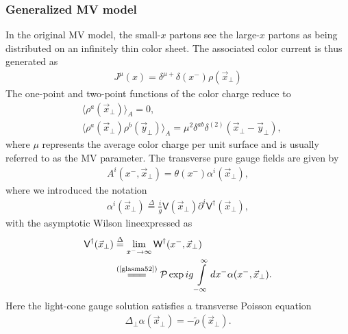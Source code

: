 \subsubsection*{Generalized MV model}
In the original {\sffamily MV} model, the small-$x$ partons see the large-$x$ partons as being distributed on an infinitely thin color sheet. The associated color current is thus generated as 
\begin{align}\label{sglasma8}
    J^\mu(x)=\delta^{\mu+}\delta(x^-)\rho(\vec{x}_\perp)
\end{align}
The one-point and two-point functions of the color charge reduce to
\begin{align*}
&\langle \rho^a\left(\vec{x}_\perp\right)\rangle_A=0,\\
&\langle \rho^a\left(\vec{x}_\perp\right)\rho^b\left(\vec{y}_\perp\right)\rangle_A=\mu^2\delta^{ab}\delta^{(2)}\left(\vec{x}_\perp-\vec{y}_\perp\right),
\end{align*}
where $\mu$ represents the average color charge per unit surface and is usually referred to as the {\sffamily MV} parameter. The transverse pure gauge fields are given by 
\begin{align}\label{sglasma4}
    A^i(x^-,\vec{x}_\perp)=\theta(x^-)\alpha^i(\vec{x}_\perp),
\end{align}
where we introduced the notation
\begin{align}\label{sglasma5}
    \alpha^i(\vec{x}_\perp)\overset{\Delta}{=}\frac{i}{g}\textsf{V}(\vec{x}_\perp)\partial^i\textsf{V}^\dagger(\vec{x}_\perp),
\end{align}
with the asymptotic Wilson lineexpressed as
\begin{align*}
    \textsf{V}^\dagger(\vec{x}_\perp)&\overset{\Delta}{=}\lim\limits_{x^-\rightarrow\infty}\textsf{W}^\dagger(x^-,\vec{x}_\perp)\\
    &\stackrel{(\text{\cref{glasma52}})}{=\joinrel=\joinrel=}\mathcal{P}\exp{ig\int\limits_{-\infty}^{\infty}dx^-\alpha(x^-,\vec{x}_\perp)}.   
\end{align*}
Here the light-cone gauge solution satisfies a transverse Poisson equation
\begin{align}\label{sglasma3}
    \Delta_\perp\alpha(\vec{x}_\perp)=-\widetilde{\rho}(\vec{x}_\perp).
\end{align}

